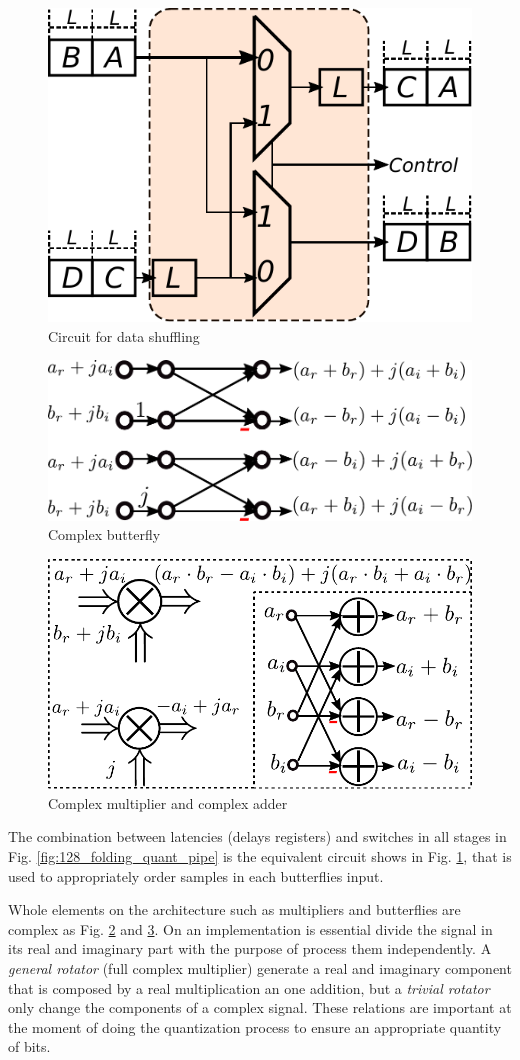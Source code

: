 \documentclass[journal,comsoc]{IEEEtran}
\begin{document}
\begin{figure} 
	\centering
	\includegraphics[width=0.42\linewidth]{Diagramas/miSeccionFiguras/Shift.pdf}
	\caption{Circuit for data shuffling}
	\label{fig:shift}
\end{figure}
\begin{figure} 
	\centering
	\includegraphics[width=0.65\linewidth]{Diagramas/miSeccionFiguras/ButterComplejo.pdf}
	\caption{Complex butterfly }
	\label{fig:buttercomplejo}
\end{figure}
\begin{figure} 
	\centering
	\includegraphics[width=0.65\linewidth]{Diagramas/miSeccionFiguras/SumMult.pdf}
	\caption{Complex multiplier and complex adder}
	\label{fig:summult}
\end{figure}

The combination between latencies (delays registers) and switches in all stages in Fig. \ref{fig:128_folding_quant_pipe} is the equivalent circuit shows in Fig. \ref{fig:shift}, that is used to appropriately order samples in each butterflies input.

Whole elements on the architecture such as multipliers and butterflies are complex as Fig. \ref{fig:buttercomplejo} and \ref{fig:summult}. On an implementation is essential divide the signal in its real and imaginary part with the purpose of process them independently. A \textit{general rotator} (full complex multiplier) generate a real and imaginary component that is composed by a real multiplication an one addition, but a \textit{trivial rotator} only change the components of a complex signal. These relations are important at the moment of doing the quantization process to ensure an appropriate quantity of bits.
\end{document}
